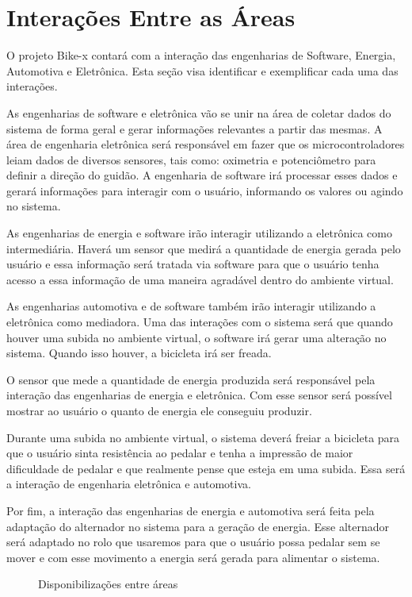 \chapter[Interações]{Interações Entre as Áreas}

O projeto Bike-x contará com a interação das engenharias de Software, Energia, Automotiva e Eletrônica. Esta seção visa identificar e exemplificar cada uma 
das interações. 

As engenharias de software e eletrônica vão se unir na área de coletar dados do sistema de forma geral e gerar informações relevantes a partir das mesmas. 
A área de engenharia eletrônica será responsável em fazer que os microcontroladores leiam dados de diversos sensores, tais como: oximetria e potenciômetro para 
definir a direção do guidão.  A engenharia de software irá processar esses dados e gerará informações para interagir com o usuário, informando os valores ou 
agindo no sistema.

As engenharias de energia e software irão interagir utilizando a eletrônica como intermediária. Haverá um sensor que medirá a quantidade de energia gerada 
pelo usuário e essa informação será tratada via software para que o usuário tenha acesso a essa informação de uma maneira agradável dentro do ambiente virtual.

As engenharias automotiva e de software também irão interagir utilizando a eletrônica como mediadora. Uma das interações com o sistema será que quando houver 
uma subida no ambiente virtual, o software irá gerar uma alteração no sistema. Quando isso houver, a bicicleta irá ser freada.

O sensor que mede a quantidade de energia produzida será responsável pela interação das engenharias de energia e eletrônica. Com esse sensor será possível 
mostrar ao usuário o quanto de energia ele conseguiu produzir. 

Durante uma subida no ambiente virtual, o sistema deverá freiar a bicicleta para que o usuário sinta resistência ao pedalar e tenha a impressão de maior 
dificuldade de pedalar e que realmente pense que esteja em uma subida. Essa será a interação de engenharia eletrônica e automotiva.

Por fim, a interação das engenharias de energia e automotiva será feita pela adaptação do alternador no sistema para a geração de energia. Esse alternador 
será adaptado no rolo que usaremos para que o usuário possa pedalar sem se mover e com esse movimento a energia será gerada para alimentar o sistema.

\begin{figure}[h]
  \centering
  
  \caption{Disponibilizações entre áreas}
  \label{intera}
\end{figure}

